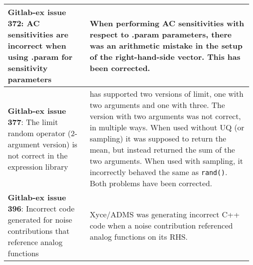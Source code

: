 {\begin{longtable}[h] {>{\raggedright\small}m{2in}|>{\raggedright\let\\\tabularnewline\small}m{3.5in}}
\textbf{Gitlab-ex issue 372}:  AC sensitivities are incorrect when using .param for sensitivity parameters &
When performing AC sensitivities with respect to .param parameters,
there was an arithmetic mistake in the setup of the right-hand-side
vector.  This has been corrected.  \\ \hline

\textbf{Gitlab-ex issue 377}:  The limit random operator (2-argument version) is not correct in the expression library &
\Xyce{} has supported two versions of limit, one with two arguments and one
with three.  The version with two arguments was not correct, in
multiple ways.  When used without UQ (or sampling) it was supposed to
return the mean, but instead returned the sum of the two arguments.
When used with sampling, it incorrectly behaved the same
as \texttt{rand()}.  Both problems have been corrected.  \\ \hline

\textbf{Gitlab-ex issue 396}: Incorrect code generated for noise contributions that reference analog functions &
Xyce/ADMS was generating incorrect C++ code when a noise contribution referenced analog functions on its RHS.  \\ \hline

\end{longtable}
}
